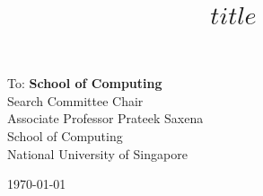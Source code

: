 \documentclass[11pt, a4paper]{article}
\title{$title$}
\begin{document}
\maketitle
\vspace{1em}

\begin{minipage}[t]{0.49\textwidth} 
  To: {\bf School of Computing} \\
  {
    Search Committee Chair\\
    Associate Professor Prateek Saxena\\
    School of Computing\\
    National University of Singapore    
  }
\end{minipage}\hfill\begin{minipage}[t]{0.49\textwidth}
  \begin{flushright}\today\end{flushright}
\end{minipage}

\vspace{2em}
\end{document}
